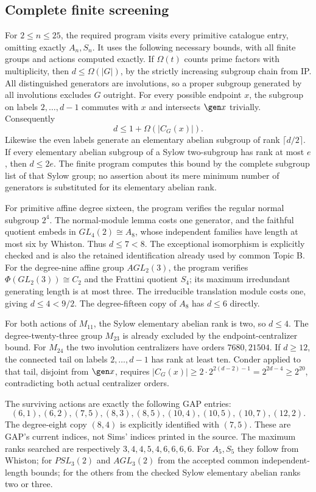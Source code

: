 \subsection{Complete finite screening}
For $2\leq n\leq25$, the required program visits every primitive
catalogue entry, omitting exactly $A_n,S_n$. It uses the following
necessary bounds, with all finite groups and actions computed exactly.
If $\Omega(t)$ counts prime factors with multiplicity, then
$d\leq\Omega(|G|)$, by the strictly increasing subgroup chain from IP.
All distinguished generators are involutions, so a proper subgroup
generated by all involutions excludes $G$ outright. For every possible
endpoint $x$, the subgroup on labels $2,\ldots,d-1$ commutes with $x$
and intersects $\gen x$ trivially. Consequently
\[
 d\leq1+\Omega(|C_G(x)|).
\]
Likewise the even labels generate an elementary abelian subgroup of
rank $\lceil d/2\rceil$. If every elementary abelian subgroup of a
Sylow two-subgroup has rank at most $e$, then $d\leq2e$.
The finite program computes this bound by the complete subgroup list
of that Sylow group; no assertion about its mere minimum number of
generators is substituted for its elementary abelian rank.

For primitive affine degree sixteen, the program verifies the regular
normal subgroup $2^4$. The normal-module lemma costs one generator,
and the faithful quotient embeds in $GL_4(2)\cong A_8$, whose independent
families have length at most six by Whiston. Thus $d\leq7<8$.
The exceptional isomorphism is explicitly checked and is also the
retained identification already used by common Topic B.
For the degree-nine affine group $AGL_2(3)$, the program verifies
$\Phi(GL_2(3))\cong C_2$ and the Frattini quotient $S_4$; its maximum
irredundant generating length is at most three. The irreducible
translation module costs one, giving $d\leq4<9/2$.
The degree-fifteen copy of $A_8$ has $d\leq6$ directly.

For both actions of $M_{11}$, the Sylow elementary abelian rank is two,
so $d\leq4$. The degree-twenty-three group $M_{23}$ is already excluded
by the endpoint-centralizer bound. For $M_{24}$ the two involution
centralizers have orders $7680,21504$. If $d\geq12$, the connected tail
on labels $2,\ldots,d-1$ has rank at least ten. Conder applied to that
tail, disjoint from $\gen x$, requires
$|C_G(x)|\geq2\cdot2^{2(d-2)-1}=2^{2d-4}\geq2^{20}$,
contradicting both actual centralizer orders.

The surviving actions are exactly the following GAP entries:
\[
 (6,1),(6,2),(7,5),(8,3),(8,5),(10,4),(10,5),(10,7),(12,2).
\]
The degree-eight copy $(8,4)$ is explicitly identified with $(7,5)$.
These are GAP's current indices, not Sims' indices printed in the source.
The maximum ranks searched are respectively $3,4,4,5,4,6,6,6,6$.
For $A_5,S_5$ they follow from Whiston; for $PSL_3(2)$ and $AGL_3(2)$
from the accepted common independent-length bounds; for the others
from the checked Sylow elementary abelian ranks two or three.

